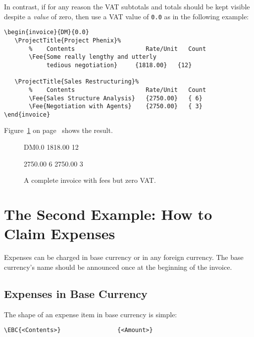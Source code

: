 \documentclass[11pt]{ltxdoc}
\begin{document}
In contrast, if for any reason the VAT subtotals and totals should
be kept visible despite a \textit{value} of zero, then use a VAT
value of \verb-0.0- as in the following example:
\begin{verbatim}
\begin{invoice}{DM}{0.0}
   \ProjectTitle{Project Phenix}%
       %    Contents                    Rate/Unit   Count
       \Fee{Some really lengthy and utterly
       		tedious negotiation}     {1818.00}   {12}

   \ProjectTitle{Sales Restructuring}%
       %    Contents                    Rate/Unit   Count
       \Fee{Sales Structure Analysis}   {2750.00}   { 6}
       \Fee{Negotiation with Agents}    {2750.00}   { 3}
\end{invoice}
\end{verbatim}


Figure~\ref{invoice_with_zero_VAT} on
page~\pageref{invoice_with_zero_VAT}
shows the result.

\begin{figure}[h]
\begin{invoice}{DM}{0.0}
		{1818.00}	{12}

           {2750.00}   { 6}
            {2750.00}   { 3}
\end{invoice}
\caption{A complete invoice
		with fees but zero VAT.\label{invoice_with_zero_VAT}}
\end{figure}


\section{The Second Example: How to Claim Expenses}

Expenses can be charged in base currency or in any foreign currency.
The base currency's name should be announced once at the beginning
of the invoice.

\subsection{Expenses in Base Currency}

The shape of an expense item in base currency is simple:

\begin{verbatim}
\EBC{<Contents>}                {<Amount>}
\end{verbatim}
\end{document}
